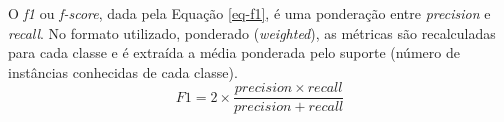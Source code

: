O \textit{f1} ou \textit{f-score}, dada pela Equação \ref{eq-f1}, é uma ponderação entre \textit{precision} e \textit{recall}. No formato utilizado, ponderado (\textit{weighted}), as métricas são recalculadas para cada classe e é extraída a média ponderada pelo suporte (número de instâncias conhecidas de cada classe).
\begin{equation}
F1 = 2 \times{\frac{precision \times recall}{precision + recall}}
\label{eq-f1}
\end{equation}

